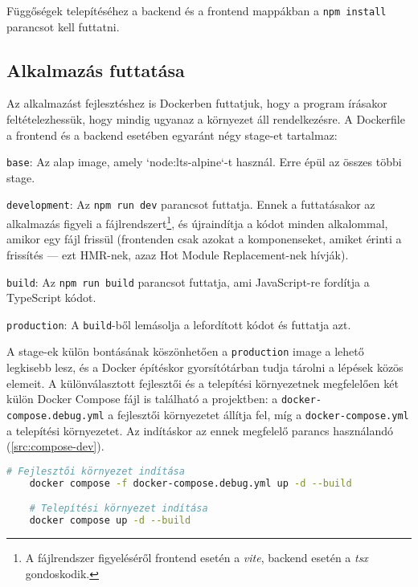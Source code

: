 Függőségek telepítéséhez a backend és a frontend mappákban a \texttt{npm install} parancsot kell futtatni.

\subsection{Alkalmazás futtatása}
\label{sec:run-app}

Az alkalmazást fejlesztéshez is Dockerben futtatjuk, hogy a program írásakor feltételezhessük, hogy mindig ugyanaz a környezet áll rendelkezésre. A Dockerfile a frontend és a backend esetében egyaránt négy stage-et tartalmaz:

\begin{compactenum}
    \item \texttt{base}: Az alap image, amely `node:lts-alpine`-t használ. Erre épül az összes többi stage.
    \item \texttt{development}: Az \texttt{npm run dev} parancsot futtatja. Ennek a futtatásakor az alkalmazás figyeli a fájlrendszert\footnote{A fájlrendszer figyeléséről frontend esetén a \textit{vite}, backend esetén a \textit{tsx} gondoskodik.}, és újraindítja a kódot minden alkalommal, amikor egy fájl frissül (frontenden csak azokat a komponenseket, amiket érinti a frissítés --- ezt HMR-nek, azaz Hot Module Replacement-nek hívják\cite{hmr}).
    \item \texttt{build}: Az \texttt{npm run build} parancsot futtatja, ami JavaScript-re fordítja a TypeScript kódot.
    \item \texttt{production}: A \texttt{build}-ből lemásolja a lefordított kódot és futtatja azt.
\end{compactenum}

A stage-ek külön bontásának köszönhetően a \texttt{production} image a lehető legkisebb lesz, és a Docker építéskor gyorsítótárban tudja tárolni a lépések közös elemeit. A különválasztott fejlesztői és a telepítési környezetnek megfelelően két külön Docker Compose fájl is található a projektben: a \texttt{docker-compose.debug.yml} a fejlesztői környezetet állítja fel, míg a \texttt{docker-compose.yml} a telepítési környezetet. Az indításkor az ennek megfelelő parancs használandó (\ref{src:compose-dev}).

\begin{lstlisting}[language={bash}]
    # Fejlesztői környezet indítása
    docker compose -f docker-compose.debug.yml up -d --build

    # Telepítési környezet indítása
    docker compose up -d --build
\end{lstlisting}

